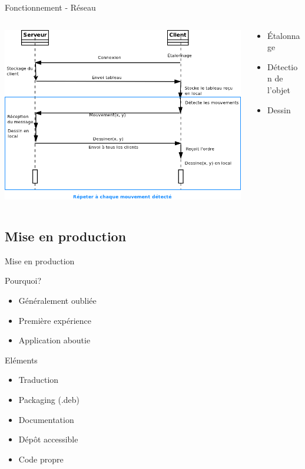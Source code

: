 \documentclass{beamer}
\begin{document}
		\begin{frame}{Fonctionnement - Réseau}
			\begin{columns}
				\begin{column}{9cm}
					\includegraphics[scale=0.35]{sequence_reseau.png}
				\end{column}
				\begin{column}{5cm}
					\begin{itemize}
						\item Étalonnage
						\item Détection de l'objet
						\item Dessin
					\end{itemize}
				\end{column}
			\end{columns}
		\end{frame}
		
		\subsection{Mise en production}
		\begin{frame}{Mise en production}
			\begin{block}{Pourquoi?}
				\begin{itemize}
					\item Généralement oubliée
					\item Première expérience
					\item Application aboutie
				\end{itemize}
			\end{block}
			\pause
			\begin{block}{Eléments}
				\begin{itemize}
					\item Traduction
					\item Packaging (.deb)
					\item Documentation
					\item Dépôt accessible
					\item Code propre
				\end{itemize}
			\end{block}
		\end{frame}
		
\end{document}
